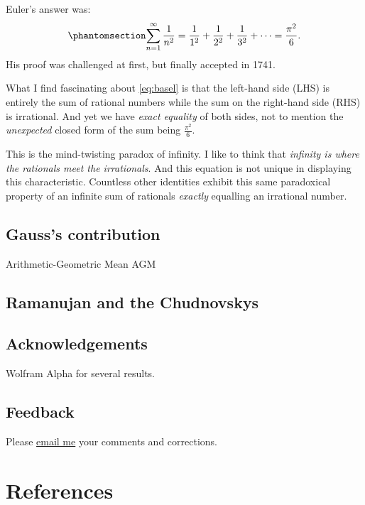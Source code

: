 \documentclass[
  a4paper,
]{article}
\begin{document}
Euler's answer was: \begin{equation}\phantomsection\label{eq:basel}{
\sum_{n=1}^\infty \frac{1}{n^2} = \frac{1}{1^2} + \frac{1}{2^2} + \frac{1}{3^2} + \cdots = \frac{\pi^2}{6}.
}\end{equation} His proof was challenged at first, but finally accepted
in 1741.

What I find fascinating about \cref{eq:basel} is that the left-hand side
(LHS) is entirely the sum of rational numbers while the sum on the
right-hand side (RHS) is irrational. And yet we have \emph{exact
equality} of both sides, not to mention the \emph{unexpected} closed
form of the sum being \(\tfrac{\pi^2}{6}\).

This is the mind-twisting paradox of infinity. I like to think that
\emph{infinity is where the rationals meet the irrationals}. And this
equation is not unique in displaying this characteristic. Countless
other identities exhibit this same paradoxical property of an infinite
sum of rationals \emph{exactly} equalling an irrational number.

\subsection{Gauss's contribution}\label{gausss-contribution}

Arithmetic-Geometric Mean AGM

\subsection{Ramanujan and the
Chudnovskys}\label{ramanujan-and-the-chudnovskys}

\subsection{Acknowledgements}\label{acknowledgements}

Wolfram Alpha for several results.

\subsection{Feedback}\label{feedback}

Please \href{mailto:feedback.swanlotus@gmail.com}{email me} your
comments and corrections.

\section*{References}\label{bibliography}
\end{document}
